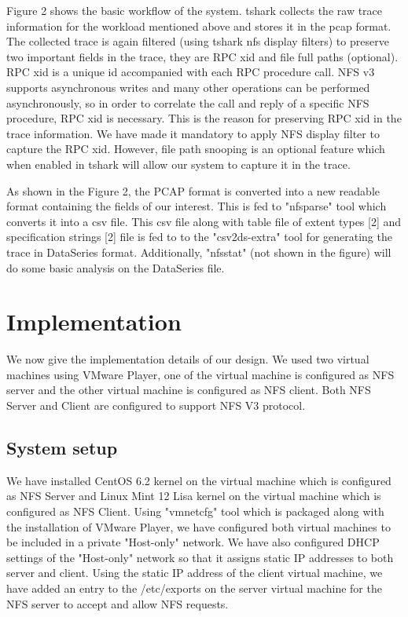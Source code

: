 \documentclass[conference]{IEEEtran}
\begin{document}
Figure 2 shows the basic workflow of the system. tshark collects the raw trace information for the workload mentioned above and stores it in the pcap format. The collected trace is again filtered (using tshark nfs display filters) to preserve two important fields in the trace, they are RPC xid and file full paths (optional). RPC xid is a unique id accompanied with each RPC procedure call. NFS v3 supports asynchronous writes and many other operations can be performed asynchronously, so in order to correlate the call and reply of a specific NFS procedure, RPC xid is necessary. This is the reason for preserving RPC xid in the trace information. We have made it mandatory to apply NFS display filter to capture the RPC xid. However, file path snooping is an optional feature which when enabled in tshark will allow our system to capture it in the trace. 

As shown in the Figure 2, the PCAP format is converted into a new readable format containing the fields of our interest. This is fed to "nfsparse" tool which converts it into a csv file. This csv file along with table file of extent types [2] and specification strings [2] file is fed to to the "csv2ds-extra" tool for generating the trace in DataSeries format. Additionally, "nfsstat" (not shown in the figure) will do some basic analysis on the DataSeries file.

\section{Implementation}
We now give the implementation details of our design. We used two virtual machines using VMware Player, one of the virtual machine is configured as NFS server and the other virtual machine is configured as NFS client. Both NFS Server and Client are configured to support NFS V3 protocol.

\subsection{System setup}
We have installed CentOS 6.2 kernel on the virtual machine which is configured as NFS Server and Linux Mint 12 Lisa kernel on the virtual machine which is configured as NFS Client. Using "vmnetcfg" tool which is packaged along with the installation of VMware Player, we have configured both virtual machines to be included in a private "Host-only" network. We have also configured DHCP settings of the "Host-only" network so that it assigns static IP addresses to both server and client. Using the static IP address of the client virtual machine, we have added an entry to the /etc/exports on the server virtual machine for the NFS server to accept and allow NFS requests.
\end{document}
